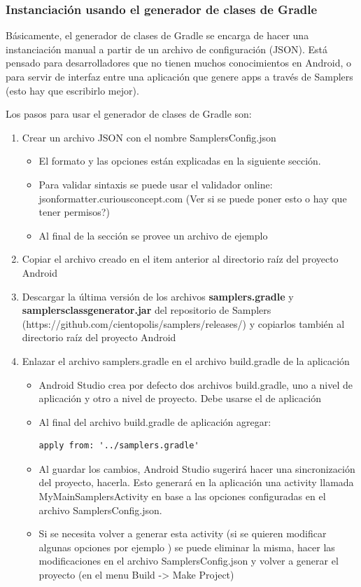 \subsubsection{Instanciación usando el  generador de clases de Gradle}

Básicamente, el generador de clases de Gradle se encarga de hacer una instanciación manual a partir de un archivo de configuración (JSON). Está pensado para desarrolladores que no tienen muchos conocimientos en Android, o para servir de interfaz entre una aplicación que genere apps a través de Samplers (esto hay que escribirlo mejor).

Los pasos para usar el generador de clases de Gradle son:
\begin{enumerate}
	\item Crear un archivo JSON con el nombre SamplersConfig.json
		\begin{itemize}
			\item El formato y las opciones están explicadas en la siguiente sección.
			\item Para validar sintaxis se puede usar el validador online: jsonformatter.curiousconcept.com (Ver si se puede poner esto o hay que tener permisos?)
			\item Al final de la sección se provee un archivo de ejemplo
		\end{itemize}
		
	\item Copiar el archivo creado en el item anterior al directorio raíz del proyecto Android
	
	\item Descargar la última versión de los archivos \textbf{samplers.gradle} y \textbf{samplersclassgenerator.jar} del repositorio de Samplers (https://github.com/cientopolis/samplers/releases/) y copiarlos también al directorio raíz del proyecto Android
	
	\item Enlazar el archivo samplers.gradle en el archivo build.gradle de la aplicación
		\begin{itemize}
			\item Android Studio crea por defecto dos archivos build.gradle, uno a nivel de aplicación y otro a nivel de proyecto. Debe usarse el de aplicación
			\item Al final del archivo build.gradle de aplicación agregar:
\begin{lstlisting}[language=XML, frame=tlb]
apply from: '../samplers.gradle'
\end{lstlisting}
			\item Al guardar los cambios, Android Studio sugerirá hacer una sincronización del proyecto, hacerla. Esto generará en la aplicación una activity llamada MyMainSamplersActivity en base a las opciones configuradas en el archivo SamplersConfig.json.
			\item Si se necesita volver a generar esta activity (si se quieren modificar algunas opciones por ejemplo ) se puede eliminar la misma, hacer las modificaciones en el archivo SamplersConfig.json y volver a generar el proyecto (en el menu Build -> Make Project)
		\end{itemize}
		

\end{enumerate}
